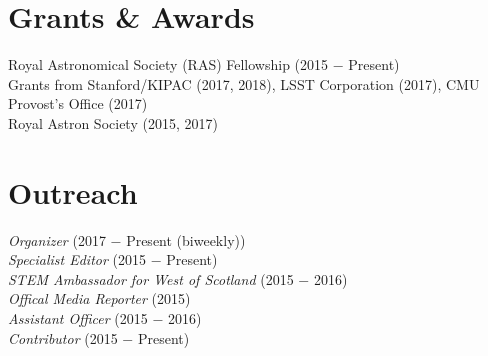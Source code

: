 \documentclass[]{deedy-resume-openfont}
\begin{document}
\begin{minipage}[t]{0.33\textwidth}
\section{\color{Blue} Grants \& Awards} 
\textbullet{} Royal Astronomical Society (RAS) Fellowship (2015 $-$ Present) \\
\textbullet{} Grants from Stanford/KIPAC (2017, 2018), LSST Corporation (2017), CMU Provost's Office (2017) \\ Royal Astron Society (2015, 2017)\\
\sectionsep


\section{\color{Blue} Outreach}
 \textit{Organizer} (2017 $-$ Present (biweekly)) \\
 \textit{Specialist Editor} (2015 $-$ Present) \\
 \textit{STEM Ambassador for West of Scotland} (2015 $-$ 2016) \\
 \textit{Offical Media Reporter} (2015) \\
 \textit{Assistant Officer} (2015 $-$ 2016) \\
 \textit{Contributor} (2015 $-$ Present) \\
\sectionsep



%
%

\end{minipage} 
\hfill
\end{document}
